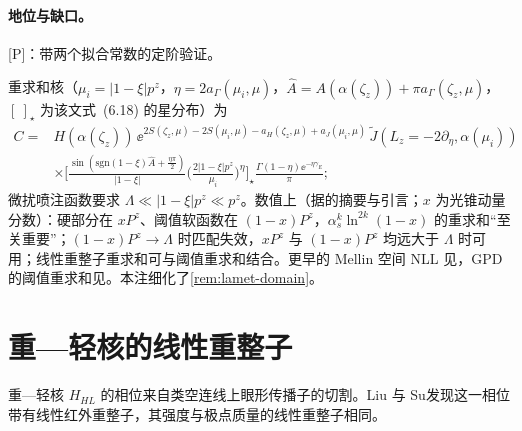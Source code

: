 \paragraph{地位与缺口。}[P]：带两个拟合常数的定阶验证\cite[第~5~节、式~(5.7)、(5.10)--(5.11)]{Ji:2023pba}。

\begin{remark}\label{rem:yzliu-threshold-domain}
重求和核\cite[式~(6.19)]{Ji:2023pba}（$\mu_i=|1-\xi|p^z$，$\eta=2a_\Gamma(\mu_i,\mu)$，$\hat A=A(\alpha(\zeta_z))+\pi a_\Gamma(\zeta_z,\mu)$，$[\ ]_\star$ 为该文式~(6.18) 的星分布）为 %
\begin{equation*}
\begin{aligned}
C={}&H(\alpha(\zeta_z))\,\ee^{2S(\zeta_z,\mu)-2S(\mu_i,\mu)-a_H(\zeta_z,\mu)+a_J(\mu_i,\mu)}\,\tilde J(L_z=-2\partial_\eta,\alpha(\mu_i))\\
&\times\Big[\frac{\sin(\mathrm{sgn}(1-\xi)\hat A+\frac{\eta\pi}2)}{|1-\xi|}\Big(\frac{2|1-\xi|p^z}{\mu_i}\Big)^\eta\Big]_\star\frac{\Gamma(1-\eta)\ee^{-\eta\gamma_E}}\pi ;
\end{aligned}
\end{equation*}
微扰喷注函数要求 $\Lambda\ll|1-\xi|p^z\ll p^z$。数值上（据\cite{Ji:2024hit}的摘要与引言；$x$ 为光锥动量分数）：硬部分在 $xP^z$、阈值软函数在 $(1-x)P^z$，$\alpha_s^k\ln^{2k}(1-x)$ 的重求和“至关重要”；$(1-x)P^z\to\Lambda$ 时匹配失效，$xP^z$ 与 $(1-x)P^z$ 均远大于 $\Lambda$ 时可用；线性重整子重求和可与阈值重求和结合。更早的 Mellin 空间 NLL 见\cite{Gao:2021hxl}，GPD 的阈值重求和见\cite{Holligan:2025baj}。本注细化了\cref{rem:lamet-domain}。
\end{remark}

\section{重—轻核的线性重整子}\label{sec:yzliu-renormalon}

重—轻核 $H_{HL}$ 的相位来自类空连线上眼形传播子的切割。Liu 与 Su\cite{Liu:2023onm}发现这一相位带有线性红外重整子，其强度与极点质量的线性重整子相同。

